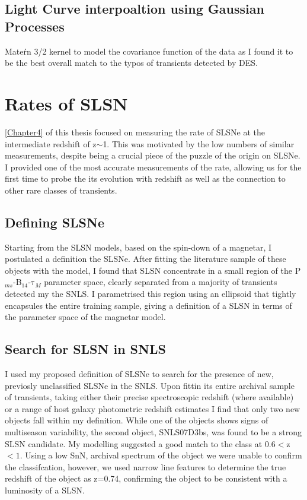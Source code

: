 \subsection{Light Curve interpoaltion using Gaussian Processes}
Mate\'rn 3/2 kernel to model the covariance function of the data as I found it to be the best overall match to the typos of transients detected by DES.

\section{Rates of SLSN}
\cref{Chapter4} of this thesis focused on measuring the rate of SLSNe at the intermediate redshift of z$\sim$1. This was motivated by the low numbers of similar measurements, despite being a crucial piece of the puzzle of the origin on SLSNe. I provided one of the most accurate measurements of the rate, allowing us for the first time to probe the its evolution with redshift as well as the connection to other rare classes of transients.

\subsection{Defining SLSNe}
Starting from the SLSN models, based on the spin-down of a magnetar, I postulated a definition the SLSNe. After fitting the literature sample of these objects with the model, I found that SLSN concentrate in a small region of the P$_{ms}$-B$_{14}$-$\mathrm{\tau}_M$ parameter space, clearly separated from a majority of transients detected my the SNLS. I parametrised this region using an ellipsoid that tightly encapsules the entire training sample, giving a definition of a SLSN in terms of the parameter space of the magnetar model.

\subsection{Search for SLSN in SNLS}
I used my proposed definition of SLSNe to search for the presence of new, previosly unclassified SLSNe in the SNLS. Upon fittin its entire archival sample of transients, taking either their precise spectroscopic redshift (where available) or a range of host galaxy photometric redshift estimates I find that only two new objects fall within my definition. While one of the objects shows signs of multiseason variability, the second object, SNLS07D3bs, was found to be a strong SLSN candidate. My modelling suggested a good match to the class at 0.6$<$z$<1$. Using a low Sn\/N, archival spectrum of the object we were unable to confirm the classifcation, however, we used narrow line features to determine the true redshift of the object as z=0.74, confirming the object to be consistent with a luminosity of a SLSN.

